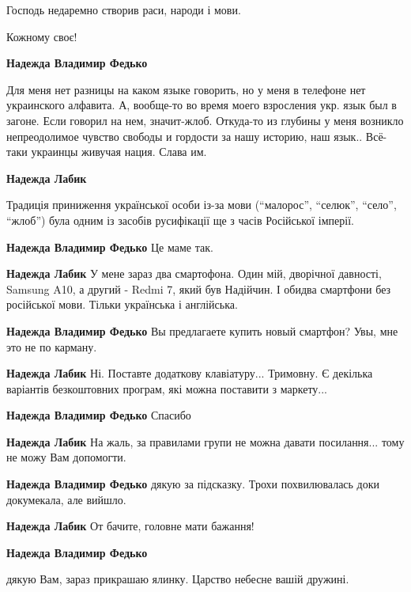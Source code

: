 \begin{itemize}
Господь недаремно створив раси, народи і мови.

Кожному своє!

\begin{itemize} %
\textbf{Надежда Владимир Федько} 

Для меня нет разницы на каком языке говорить, но у меня в телефоне нет
украинского алфавита. А, вообще-то во время моего взросления укр. язык был в
загоне. Если говорил на нем, значит-жлоб. Откуда-то из глубины у меня возникло
непреодолимое чувство свободы и гордости за нашу историю, наш язык.. Всё-таки
украинцы живучая нация. Слава им.

\begin{itemize} %
\textbf{Надежда Лабик} 

Традиція приниження української особи із-за мови (\enquote{малорос}, \enquote{селюк}, \enquote{село},
\enquote{жлоб}) була одним із засобів русифікації ще з часів Російської імперії.


\textbf{Надежда Владимир Федько} Це маме так.

\textbf{Надежда Лабик} У мене зараз два смартофона. Один мій, дворічної давності, Samsung A10, а другий - Redmi 7, який був Надійчин.
І обидва смартфони без російської мови. Тільки українська і англійська.

\textbf{Надежда Владимир Федько} Вы предлагаете купить новый смартфон? Увы, мне это не по карману.

\textbf{Надежда Лабик} Ні. Поставте додаткову клавіатуру... Тримовну. Є декілька варіантів безкоштовних програм, які можна поставити з маркету...

\textbf{Надежда Владимир Федько} Спасибо

\textbf{Надежда Лабик} На жаль, за правилами групи не можна давати посилання... тому не можу Вам допомогти.

\textbf{Надежда Владимир Федько} дякую за підсказку. Трохи похвилювалась доки докумекала, але вийшло.

\textbf{Надежда Лабик} От бачите, головне мати бажання!
\end{itemize} %

\textbf{Надежда Владимир Федько} 

дякую Вам, зараз прикрашаю ялинку. Царство небесне вашій дружині.


\end{itemize}
\end{itemize}
